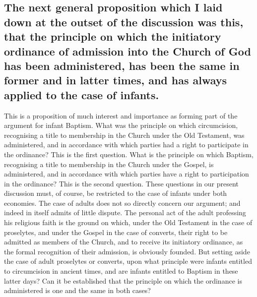 \documentclass[english,]{book}
\begin{document}
\hypertarget{the-next-general-proposition-which-i-laid-down-at-the-outset-of-the-discussion-was-this-that-the-principle-on-which-the-initiatory-ordinance-of-admission-into-the-church-of-god-has-been-administered-has-been-the-same-in-former-and-in-latter-times-and-has-always-applied-to-the-case-of-infants.}{%
\subsection{The next general proposition which I laid down at the outset of the discussion was this, that the principle on which the initiatory ordinance of admission into the Church of God has been administered, has been the same in former and in latter times, and has always applied to the case of infants.}\label{the-next-general-proposition-which-i-laid-down-at-the-outset-of-the-discussion-was-this-that-the-principle-on-which-the-initiatory-ordinance-of-admission-into-the-church-of-god-has-been-administered-has-been-the-same-in-former-and-in-latter-times-and-has-always-applied-to-the-case-of-infants.}}

This is a proposition of much interest and importance as forming part of the argument for infant Baptism. What was the principle on which circumcision, recognising a title to membership in the Church under the Old Testament, was administered, and in accordance with which parties had a right to participate in the ordinance? This is the first question. What is the principle on which Baptism, recognising a title to membership in the Church under the Gospel, is administered, and in accordance with which parties have a right to participation in the ordinance? This is the second question. These questions in our present discussion must, of course, be restricted to the case of infants under both economies. The case of adults does not so directly concern our argument; and indeed in itself admits of little dispute. The personal act of the adult professing his religious faith is the ground on which, under the Old Testament in the case of proselytes, and under the Gospel in the case of converts, their right to be admitted as members of the Church, and to receive its initiatory ordinance, as the formal recognition of their admission, is obviously founded. But setting aside the case of adult proselytes or converts, upon what principle were infants entitled to circumcision in ancient times, and are infants entitled to Baptism in these latter days? Can it be established that the principle on which the ordinance is administered is one and the same in both cases?
\end{document}
